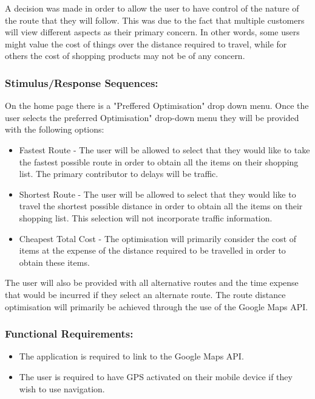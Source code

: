 \documentclass[10pt,twocolumn]{witseiepaper}
\begin{document}
		A decision was made in order to allow the user to have control of the nature of the route that they will follow. This was due to the fact that multiple customers will view different aspects as their primary concern. In other words, some users might value the cost of things over the distance required to travel, while for others the cost of shopping products may not be of any concern. 
		
		\subsubsection*{Stimulus/Response Sequences:}
		
		On the home page there is a "Preffered Optimisation" drop down menu. Once the user selects the preferred Optimisation" drop-down menu they will be provided with the following options:
		
		\begin{itemize}
			\item Fastest Route - The user will be allowed to select that they would like to take the fastest possible route in order to obtain all the items on their shopping list. The primary contributor to delays will be traffic.
			\item Shortest Route - The user will be allowed to select that they would like to travel the shortest possible distance in order to obtain all the items on their shopping list. This selection will not incorporate traffic information.
			\item Cheapest Total Cost - The optimisation will primarily consider the cost of items at the expense of the distance required to be travelled in order to obtain these items. 
		\end{itemize}
		
		The user will also be provided with all alternative routes and the time expense that would be incurred if they select an alternate route. The route distance optimisation will primarily be achieved through the use of the Google Maps API.
		
		\subsubsection*{Functional Requirements:}
		
		\begin{itemize}
			\item The application is required to link to the Google Maps API. 
			\item The user is required to have GPS activated on their mobile device if they wish to use navigation.
		\end{itemize}
		
\end{document}
